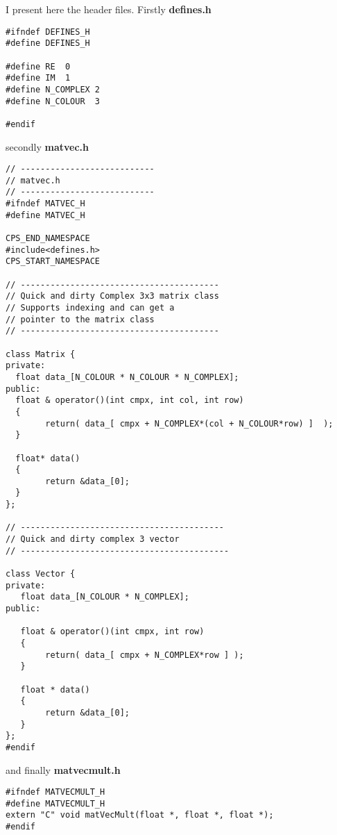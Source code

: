 I present here the header files. Firstly {\bf defines.h}
{\scriptsize
\begin{verbatim}
#ifndef DEFINES_H
#define DEFINES_H

#define RE  0
#define IM  1
#define N_COMPLEX 2
#define N_COLOUR  3

#endif
\end{verbatim}}
secondly {\bf matvec.h} 
{\scriptsize
\begin{verbatim}
// ---------------------------
// matvec.h
// ---------------------------
#ifndef MATVEC_H
#define MATVEC_H

CPS_END_NAMESPACE
#include<defines.h>
CPS_START_NAMESPACE

// ----------------------------------------
// Quick and dirty Complex 3x3 matrix class
// Supports indexing and can get a
// pointer to the matrix class
// ----------------------------------------

class Matrix {
private:
  float data_[N_COLOUR * N_COLOUR * N_COMPLEX];
public:
  float & operator()(int cmpx, int col, int row) 
  {
        return( data_[ cmpx + N_COMPLEX*(col + N_COLOUR*row) ]  );
  }

  float* data() 
  {
        return &data_[0]; 
  }
};

// -----------------------------------------
// Quick and dirty complex 3 vector
// ------------------------------------------

class Vector {
private:
   float data_[N_COLOUR * N_COMPLEX];
public: 

   float & operator()(int cmpx, int row) 
   {
        return( data_[ cmpx + N_COMPLEX*row ] );
   }
 
   float * data()
   { 
        return &data_[0];
   }
}; 
#endif
\end{verbatim}}
and finally {\bf matvecmult.h}
{\scriptsize
\begin{verbatim}
#ifndef MATVECMULT_H
#define MATVECMULT_H
extern "C" void matVecMult(float *, float *, float *);
#endif
\end{verbatim}}

